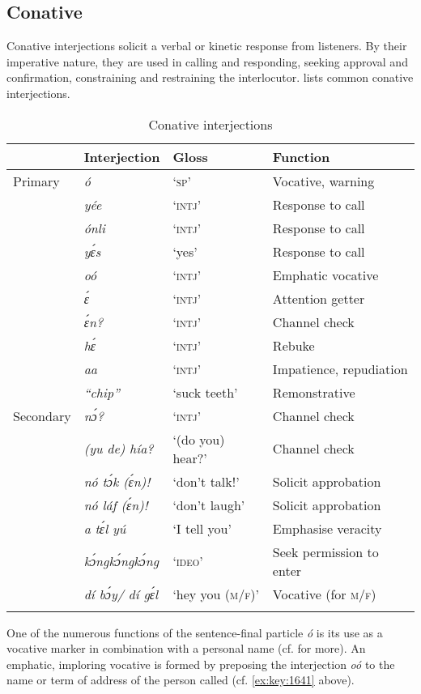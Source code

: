 \subsection{Conative}\label{sec:12.2.3}

Conative interjections solicit a verbal or kinetic response from listeners. By their imperative nature, they are used in calling and responding, seeking approval and confirmation, constraining and restraining the interlocutor.  lists common conative interjections.

\begin{table}
\caption{Conative interjections}
\label{tab:key:12.4}

\begin{tabularx}{\textwidth}{Xlll}
\lsptoprule
 & Interjection & Gloss & Function\\
 \midrule 
Primary & \itshape ó & ‘\textsc{sp}’ & Vocative, warning\\
& \itshape yée & ‘\textsc{intj}’ & Response to call\\
& \itshape ónli & ‘\textsc{intj}’ & Response to call\\
& \itshape yɛ́s & ‘yes’ & Response to call\\
& \itshape oó & ‘\textsc{intj}’ & Emphatic vocative\\
& \itshape ɛ́ & ‘\textsc{intj}’ & Attention getter\\
& \itshape ɛ́n? & ‘\textsc{intj}’ & Channel check\\
& \itshape hɛ́ & ‘\textsc{intj}’ & Rebuke\\
& \itshape aa & ‘\textsc{intj}’ & Impatience, repudiation\\
& \itshape “chip” & ‘suck teeth’ & Remonstrative\\

\tablevspace
Secondary & \itshape nɔ́? & ‘\textsc{intj}’ & Channel check\\
& \itshape (yu de) hía? & ‘(do you) hear?’ & Channel check\\
& \itshape nó tɔ́k (ɛ́n)! & ‘don’t talk!’ & Solicit approbation\\
& \itshape nó láf (ɛ́n)! & ‘don’t laugh’ & Solicit approbation\\
& \itshape a tɛ́l yú & ‘I tell you’ & Emphasise veracity\\
& \itshape kɔ́ngkɔ́ngkɔ́ng & ‘\textsc{ideo}’ & Seek permission to enter\\
& \itshape dí bɔ́y/ dí gɛ́l & ‘hey you (\textsc{m/f)}’ & Vocative (for \textsc{m}/\textsc{f})\\
\lspbottomrule
\end{tabularx}
\end{table}
One of the numerous functions of the sentence-final particle \textit{ó} is its use as a vocative marker in combination with a personal name (cf.  for more). An emphatic, imploring vocative is formed by preposing the interjection \textit{oó} to the name or term of address of the person called (cf. \ref{ex:key:1641} above). 


